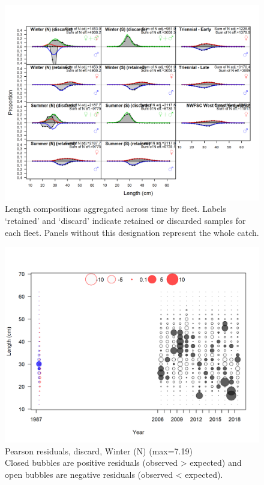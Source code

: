 \documentclass[12pt,]{article}
\begin{document}
\FloatBarrier

\begin{figure}
\centering
\includegraphics{r4ss/plots_mod1/comp_lenfit__aggregated_across_time.png}
\caption{Length compositions aggregated across time by fleet. Labels
`retained' and `discard' indicate retained or discarded samples for each
fleet. Panels without this designation represent the whole catch.
\label{fig:length_agg}}
\end{figure}

\FloatBarrier

\begin{figure}
\centering
\includegraphics{r4ss/plots_mod1/comp_lenfit_residsflt1mkt1.png}
\caption{Pearson residuals, discard, Winter (N) (max=7.19)\\
Closed bubbles are positive residuals (observed \textgreater{} expected)
and open bubbles are negative residuals (observed \textless{} expected).
\label{fig:discard_wn_len_pearson}}
\end{figure}
\end{document}

